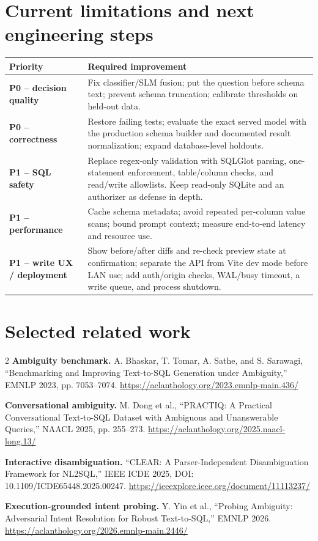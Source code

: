 \documentclass[9pt,a4paper]{extarticle}
\begin{document}
\section{Current limitations and next engineering steps}
\begin{tabularx}{\linewidth}{>{\bfseries\color{navy}}p{2.45cm} X}
\toprule
Priority & Required improvement \\
\midrule
P0 -- decision quality & Fix classifier/SLM fusion; put the question before schema text; prevent schema truncation; calibrate thresholds on held-out data. \\
P0 -- correctness & Restore failing tests; evaluate the exact served model with the production schema builder and documented result normalization; expand database-level holdouts. \\
P1 -- SQL safety & Replace regex-only validation with SQLGlot parsing, one-statement enforcement, table/column checks, and read/write allowlists. Keep read-only SQLite and an authorizer as defense in depth. \\
P1 -- performance & Cache schema metadata; avoid repeated per-column value scans; bound prompt context; measure end-to-end latency and resource use. \\
P1 -- write UX / deployment & Show before/after diffs and re-check preview state at confirmation; separate the API from Vite dev mode before LAN use; add auth/origin checks, WAL/busy timeout, a write queue, and process shutdown. \\
\bottomrule
\end{tabularx}

\section{Selected related work}
\begin{multicols}{2}
\scriptsize
\textbf{Ambiguity benchmark.} A. Bhaskar, T. Tomar, A. Sathe, and S. Sarawagi, ``Benchmarking and Improving Text-to-SQL Generation under Ambiguity,'' EMNLP 2023, pp. 7053--7074.\newline
\url{https://aclanthology.org/2023.emnlp-main.436/}

\textbf{Conversational ambiguity.} M. Dong et al., ``PRACTIQ: A Practical Conversational Text-to-SQL Dataset with Ambiguous and Unanswerable Queries,'' NAACL 2025, pp. 255--273.\newline
\url{https://aclanthology.org/2025.naacl-long.13/}

\columnbreak
\textbf{Interactive disambiguation.} ``CLEAR: A Parser-Independent Disambiguation Framework for NL2SQL,'' IEEE ICDE 2025, DOI: 10.1109/ICDE65448.2025.00247.\newline
\url{https://ieeexplore.ieee.org/document/11113237/}

\textbf{Execution-grounded intent probing.} Y. Yin et al., ``Probing Ambiguity: Adversarial Intent Resolution for Robust Text-to-SQL,'' EMNLP 2026.\newline
\url{https://aclanthology.org/2026.emnlp-main.2446/}
\end{multicols}
\end{document}
